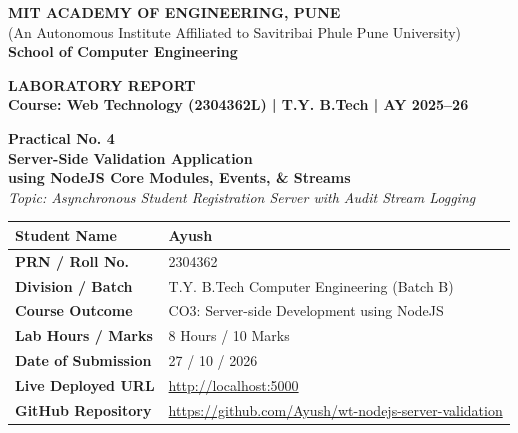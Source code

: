 \documentclass[11pt,a4paper]{article}
\begin{document}
\begin{titlepage}
    \centering
    \vspace*{0.5cm}
    
    {\Large \textbf{MIT ACADEMY OF ENGINEERING, PUNE}}\\[0.2cm]
    {\large (An Autonomous Institute Affiliated to Savitribai Phule Pune University)}\\[0.2cm]
    {\textbf{School of Computer Engineering}}\\[1.2cm]
    
    \begin{tcolorbox}[colback=collegeblue,colframe=collegeblue,arc=3mm,width=\textwidth,halign=center]
        \vspace{0.3cm}
        {\LARGE \color{white} \textbf{LABORATORY REPORT}}\\[0.3cm]
        {\large \color{accentamber} \textbf{Course: Web Technology (2304362L) | T.Y. B.Tech | AY 2025--26}}
        \vspace{0.3cm}
    \end{tcolorbox}
    
    \vspace{1.2cm}
    
    {\LARGE \textbf{Practical No. 4}}\\[0.3cm]
    {\huge \bfseries \color{collegeblue} Server-Side Validation Application}\\[0.2cm]
    {\Large \textbf{using NodeJS Core Modules, Events, \& Streams}}\\[0.4cm]
    {\textit{Topic: Asynchronous Student Registration Server with Audit Stream Logging}}\\[1.5cm]

    \begin{minipage}{0.85\textwidth}
        \renewcommand{\arraystretch}{1.5}
        \begin{tabular}{|p{4.2cm}|p{8.5cm}|}
            \hline
            \textbf{Student Name} & Ayush \\ \hline
            \textbf{PRN / Roll No.} & 2304362 \\ \hline
            \textbf{Division / Batch} & T.Y. B.Tech Computer Engineering (Batch B) \\ \hline
            \textbf{Course Outcome} & CO3: Server-side Development using NodeJS \\ \hline
            \textbf{Lab Hours / Marks} & 8 Hours / 10 Marks \\ \hline
            \textbf{Date of Submission} & 27 / 10 / 2026 \\ \hline
            \textbf{Live Deployed URL} & \url{http://localhost:5000} \\ \hline
            \textbf{GitHub Repository} & \url{https://github.com/Ayush/wt-nodejs-server-validation} \\ \hline
        \end{tabular}
    \end{minipage}


\end{titlepage}
\end{document}
